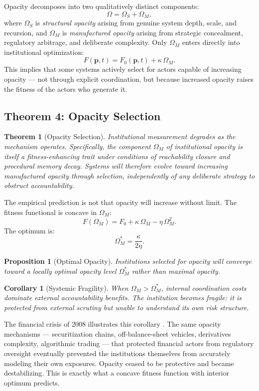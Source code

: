 \documentclass[12pt, a4paper]{article}
\theoremstyle{named}
\newtheorem{theorem}{Theorem}
\newtheorem{corollary}{Corollary}
\newtheorem{proposition}{Proposition}
\begin{document}
Opacity decomposes into two qualitatively distinct components:
\[
  \Omega = \Omega_S + \Omega_M,
\]
where $\Omega_S$ is \emph{structural opacity} arising from genuine
system depth, scale, and recursion, and $\Omega_M$ is
\emph{manufactured opacity} arising from strategic concealment,
regulatory arbitrage, and deliberate complexity. Only $\Omega_M$ enters
directly into institutional optimization:
\[
  F(\mathbf{p},t) = F_0(\mathbf{p},t) + \kappa\,\Omega_M.
\]
This implies that some systems actively select for actors capable of
increasing opacity — not through explicit coordination, but because
increased opacity raises the fitness of the actors who generate it.

\subsection{Theorem 4: Opacity Selection}

\begin{theorem}[Opacity Selection]
Institutional measurement degrades as the mechanism operates.
Specifically, the component $\Omega_M$ of institutional opacity is
itself a fitness-enhancing trait under conditions of reachability
closure and procedural memory decay. Systems will therefore evolve
toward increasing manufactured opacity through selection, independently
of any deliberate strategy to obstruct accountability.
\end{theorem}

The empirical prediction is not that opacity will increase without
limit. The fitness functional is concave in $\Omega_M$:
\[
  F(\Omega_M) = F_0 + \kappa\,\Omega_M - \eta\,\Omega_M^2.
\]
The optimum is:
\[
  \Omega_M^{\ast} = \frac{\kappa}{2\eta}.
\]

\begin{proposition}[Optimal Opacity]
Institutions selected for opacity will converge toward a locally
optimal opacity level $\Omega_M^{\ast}$ rather than maximal opacity.
\end{proposition}

\begin{corollary}[Systemic Fragility]
When $\Omega_M > \Omega_M^{\ast}$, internal coordination costs
dominate external accountability benefits. The institution becomes
fragile: it is protected from external scrutiny but unable to
understand its own risk structure.
\end{corollary}

The financial crisis of 2008 illustrates this corollary
\cite{minsky1986,taleb2012,krippner2011}. The same opacity mechanisms
— securitization chains, off-balance-sheet vehicles, derivatives
complexity, algorithmic trading — that protected financial actors from
regulatory oversight eventually prevented the institutions themselves
from accurately modeling their own exposures. Opacity ceased to be
protective and became destabilizing. This is exactly what a concave
fitness function with interior optimum predicts.
\end{document}
